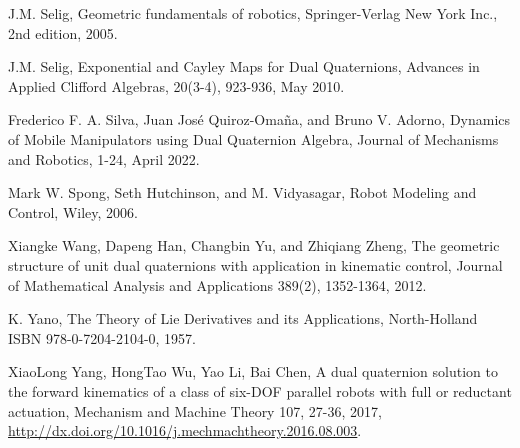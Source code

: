 \documentclass[reqno,12pt]{amsart}
\begin{document}
\begin{thebibliography}{99}
 J.M. Selig, Geometric fundamentals of robotics, Springer-Verlag New York Inc., 2nd edition, 2005.

 J.M. Selig, Exponential and Cayley Maps for Dual Quaternions, Advances in Applied Clifford Algebras, 20(3-4), 923-936, May 2010.

 Frederico F. A. Silva, Juan Jos\'e Quiroz-Oma\~na, and Bruno V. Adorno, Dynamics of Mobile Manipulators using Dual Quaternion Algebra, Journal of Mechanisms and Robotics, 1-24, April 2022.

 Mark W. Spong, Seth Hutchinson, and M. Vidyasagar, Robot Modeling and Control, Wiley, 2006.

 Xiangke Wang, Dapeng Han, Changbin Yu, and Zhiqiang Zheng, The geometric structure of unit dual quaternions with application in kinematic control, Journal of Mathematical Analysis and Applications 389(2), 1352-1364, 2012.

 K. Yano, The Theory of Lie Derivatives and its Applications, North-Holland ISBN 978-0-7204-2104-0, 1957.

 XiaoLong Yang, HongTao Wu, Yao Li, Bai Chen, A dual quaternion solution to the forward kinematics of a class of six-DOF parallel robots with full or reductant actuation, Mechanism and Machine Theory 107, 27-36, 2017, \url{http://dx.doi.org/10.1016/j.mechmachtheory.2016.08.003}.

\end{thebibliography}
\end{document}

